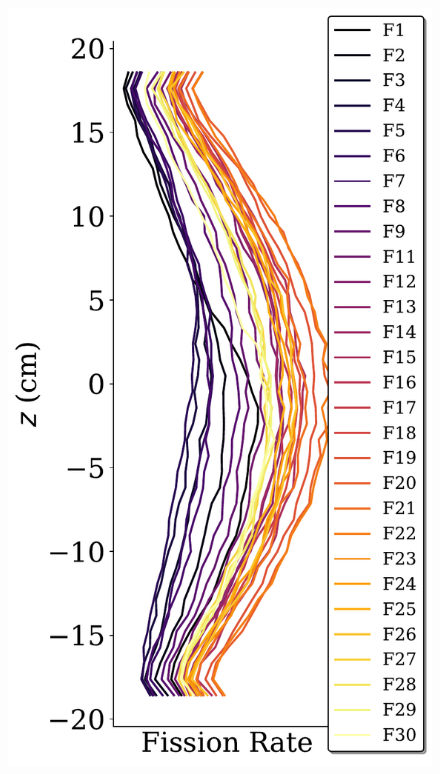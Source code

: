 \documentclass[fleqn]{beamer}
\begin{document}
\begin{frame}
\begin{figure}
\includegraphics[height = 0.8\textheight]{axial_rr_density_F}
\caption{}
\end{figure}

\end{frame}
\end{document}
